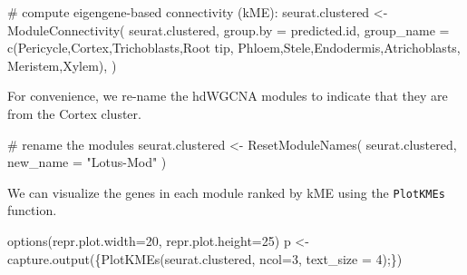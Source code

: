 \documentclass[
  letterpaper,
  DIV=11,
  numbers=noendperiod]{scrartcl}
\newenvironment{Shaded}{\begin{snugshade}}{\end{snugshade}}
\newcommand{\AttributeTok}[1]{\textcolor[rgb]{0.40,0.45,0.13}{#1}}
\newcommand{\CommentTok}[1]{\textcolor[rgb]{0.37,0.37,0.37}{#1}}
\newcommand{\DecValTok}[1]{\textcolor[rgb]{0.68,0.00,0.00}{#1}}
\newcommand{\FunctionTok}[1]{\textcolor[rgb]{0.28,0.35,0.67}{#1}}
\newcommand{\NormalTok}[1]{\textcolor[rgb]{0.00,0.23,0.31}{#1}}
\newcommand{\OtherTok}[1]{\textcolor[rgb]{0.00,0.23,0.31}{#1}}
\newcommand{\StringTok}[1]{\textcolor[rgb]{0.13,0.47,0.30}{#1}}
\begin{document}
\begin{Shaded}
\begin{Highlighting}[]
\CommentTok{\# compute eigengene{-}based connectivity (kME):}
\NormalTok{seurat.clustered }\OtherTok{\textless{}{-}} \FunctionTok{ModuleConnectivity}\NormalTok{(}
\NormalTok{  seurat.clustered,}
  \AttributeTok{group.by =} \StringTok{\textquotesingle{}predicted.id\textquotesingle{}}\NormalTok{, }
  \AttributeTok{group\_name =} \FunctionTok{c}\NormalTok{(}\StringTok{\textquotesingle{}Pericycle\textquotesingle{}}\NormalTok{,}\StringTok{\textquotesingle{}Cortex\textquotesingle{}}\NormalTok{,}\StringTok{\textquotesingle{}Trichoblasts\textquotesingle{}}\NormalTok{,}\StringTok{\textquotesingle{}Root tip\textquotesingle{}}\NormalTok{,}
                 \StringTok{\textquotesingle{}Phloem\textquotesingle{}}\NormalTok{,}\StringTok{\textquotesingle{}Stele\textquotesingle{}}\NormalTok{,}\StringTok{\textquotesingle{}Endodermis\textquotesingle{}}\NormalTok{,}\StringTok{\textquotesingle{}Atrichoblasts\textquotesingle{}}\NormalTok{,}
                 \StringTok{\textquotesingle{}Meristem\textquotesingle{}}\NormalTok{,}\StringTok{\textquotesingle{}Xylem\textquotesingle{}}\NormalTok{),}
\NormalTok{)}
\end{Highlighting}
\end{Shaded}

For convenience, we re-name the hdWGCNA modules to indicate that they
are from the Cortex cluster.

\begin{Shaded}
\begin{Highlighting}[]
\CommentTok{\# rename the modules}
\NormalTok{seurat.clustered }\OtherTok{\textless{}{-}} \FunctionTok{ResetModuleNames}\NormalTok{(}
\NormalTok{  seurat.clustered,}
  \AttributeTok{new\_name =} \StringTok{"Lotus{-}Mod"}
\NormalTok{)}
\end{Highlighting}
\end{Shaded}

We can visualize the genes in each module ranked by kME using the
\texttt{PlotKMEs} function.

\begin{Shaded}
\begin{Highlighting}[]
\FunctionTok{options}\NormalTok{(}\AttributeTok{repr.plot.width=}\DecValTok{20}\NormalTok{, }\AttributeTok{repr.plot.height=}\DecValTok{25}\NormalTok{)}
\NormalTok{p }\OtherTok{\textless{}{-}} \FunctionTok{capture.output}\NormalTok{(\{}\FunctionTok{PlotKMEs}\NormalTok{(seurat.clustered, }\AttributeTok{ncol=}\DecValTok{3}\NormalTok{, }\AttributeTok{text\_size =} \DecValTok{4}\NormalTok{);\})}
\end{Highlighting}
\end{Shaded}
\end{document}
